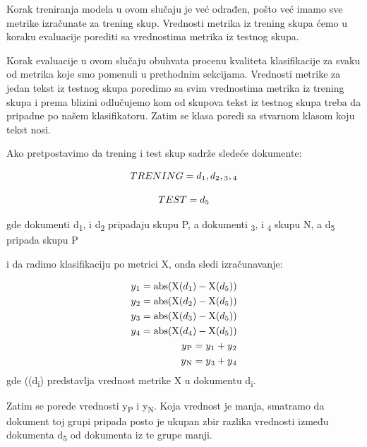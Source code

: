\documentclass[12pt,oneside]{memoir}
\begin{document}
Korak treniranja modela u ovom slučaju je već odrađen, pošto već imamo sve metrike izračunate za trening skup. Vrednosti metrika iz trening skupa ćemo u koraku evaluacije porediti sa vrednostima metrika iz testnog skupa.

Korak evaluacije u ovom slučaju obuhvata procenu kvaliteta klasifikacije za svaku od metrika koje smo pomenuli u prethodnim sekcijama.  Vrednosti metrike za jedan tekst iz testnog skupa poredimo sa svim vrednostima metrika iz trening skupa i prema blizini odlučujemo kom od skupova tekst iz testnog skupa treba da pripadne po našem klasifikatoru. Zatim se klasa poredi sa stvarnom klasom koju tekst nosi. 

Ako pretpostavimo da trening i test skup sadrže sledeće dokumente:

\begin{equation}
	TRENING = {d\textsubscript{1}, d\textsubscript{2}, \textsubscript{3}, \textsubscript{4}}
\end{equation}

\begin{equation}
	TEST = {d\textsubscript{5}}
\end{equation}

gde dokumenti d\textsubscript{1}, i d\textsubscript{2} pripadaju skupu P,  a dokumenti \textsubscript{3}, i \textsubscript{4} skupu N, a d\textsubscript{5} pripada skupu P

i da radimo klasifikaciju po metrici X, onda sledi izračunavanje:

\begin{align}
	y\textsubscript{1} = \text{abs}(\text{X}(d\textsubscript{1}) - \text{X}(d\textsubscript{5})) \\
	y\textsubscript{2} = \text{abs}(\text{X}(d\textsubscript{2}) - \text{X}(d\textsubscript{5})) \\
	y\textsubscript{3} = \text{abs}(\text{X}(d\textsubscript{3}) - \text{X}(d\textsubscript{5})) \\
	y\textsubscript{4} = \text{abs}(\text{X}(d\textsubscript{4}) - \text{X}(d\textsubscript{5})) \\
	y\textsubscript{P} = y\textsubscript{1} + y\textsubscript{2} \\
	y\textsubscript{N} = y\textsubscript{3} + y\textsubscript{4}
\end{align}
gde ((d\textsubscript{i}) predstavlja vrednost metrike X u dokumentu d\textsubscript{i}.

Zatim se porede vrednosti y\textsubscript{P} i y\textsubscript{N}.  Koja vrednost je manja,  smatramo da dokument toj grupi pripada posto je ukupan zbir razlika vrednosti između dokumenta {d\textsubscript{5}} od dokumenta iz te grupe manji.  
\end{document}
